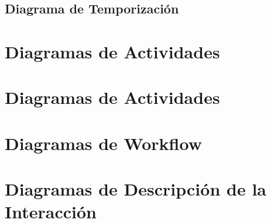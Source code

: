 \newpage

\subsection{Diagrama de Temporización}

\newpage

\section{Diagramas de Actividades}

\newpage

\section{Diagramas de Actividades}

\newpage

\section{Diagramas de Workflow}

\newpage

\section{Diagramas de Descripción de la Interacción}

\newpage
